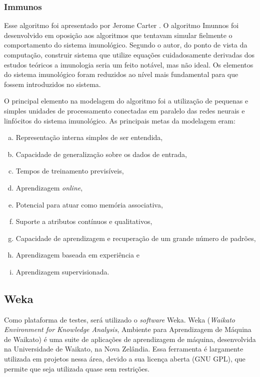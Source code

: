\subsubsection{Immunos}
\label{sec:prop_immunos}

Esse algoritmo foi apresentado por Jerome Carter \cite{Carter2000}. O algoritmo Imunnos foi desenvolvido em oposição aos algoritmos que tentavam simular fielmente o comportamento do sistema imunológico. Segundo o autor, do ponto de vista da computação, construir sistema que utilize equações cuidadosamente derivadas dos estudos teóricos a imunologia seria um feito notável, mas não ideal. Os elementos do sistema imunológico foram reduzidos ao nível mais fundamental para que fossem introduzidos no sistema.

O principal elemento na modelagem do algoritmo foi a utilização de pequenas e simples unidades de processamento conectadas em paralelo das redes neurais e linfócitos do sistema imunológico. As principais metas da modelagem eram:

\vspace{2mm}
\begin{enumerate}[a)]
    \itemsep1pt
    \item Representação interna simples de ser entendida,
    \item Capacidade de generalização sobre os dados de entrada,
    \item Tempos de treinamento previsíveis,
    \item Aprendizagem \emph{online},
    \item Potencial para atuar como memória associativa,
    \item Suporte a atributos contínuos e qualitativos,
    \item Capacidade de aprendizagem e recuperação de um grande número de padrões,
    \item Aprendizagem baseada em experiência e
    \item Aprendizagem supervisionada.
\end{enumerate}
\vspace{2mm}

\subsection{Weka}{}
\label{sec:prop_weka}

Como plataforma de testes, será utilizado o \emph{software} Weka. Weka (\emph{Waikato Environment for Knowledge Analysis}, Ambiente para Aprendizagem de Máquina de Waikato) é uma suite de aplicações de aprendizagem de máquina, desenvolvida na Universidade de Waikato, na Nova Zelândia. Essa ferramenta é largamente utilizada em projetos nessa área, devido a sua licença aberta (GNU GPL), que permite que seja utilizada quase sem restrições.

